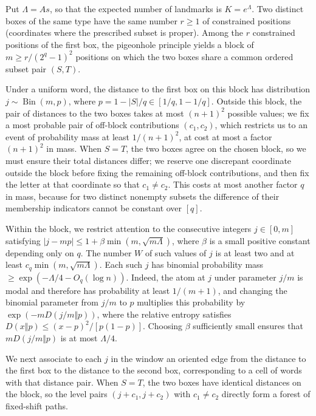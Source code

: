Put $\Lambda=As$, so that the expected number of landmarks is $K=e^{\Lambda}$. Two distinct boxes of the same type have the same number $r\ge1$ of constrained positions (coordinates where the prescribed subset is proper). Among the $r$ constrained positions of the first box, the pigeonhole principle yields a block of $m\ge r/(2^q-1)^2$ positions on which the two boxes share a common ordered subset pair $(S,T)$.

Under a uniform word, the distance to the first box on this block has distribution $j\sim\operatorname{Bin}(m,p)$, where $p=1-|S|/q\in[1/q,1-1/q]$. Outside this block, the pair of distances to the two boxes takes at most $(n+1)^2$ possible values; we fix a most probable pair of off-block contributions $(c_1,c_2)$, which restricts us to an event of probability mass at least $1/(n+1)^2$, at cost at most a factor $(n+1)^2$ in mass. When $S=T$, the two boxes agree on the chosen block, so we must ensure their total distances differ; we reserve one discrepant coordinate outside the block before fixing the remaining off-block contributions, and then fix the letter at that coordinate so that $c_1\ne c_2$. This costs at most another factor $q$ in mass, because for two distinct nonempty subsets the difference of their membership indicators cannot be constant over $[q]$.

Within the block, we restrict attention to the consecutive integers $j\in[0,m]$ satisfying $|j-mp|\le1+\beta\min(m,\sqrt{m\Lambda})$, where $\beta$ is a small positive constant depending only on $q$. The number $W$ of such values of $j$ is at least two and at least $c_q\min(m,\sqrt{m\Lambda})$. Each such $j$ has binomial probability mass $\ge\exp(-\Lambda/4-O_q(\log n))$. Indeed, the atom at $j$ under parameter $j/m$ is modal and therefore has probability at least $1/(m+1)$, and changing the binomial parameter from $j/m$ to $p$ multiplies this probability by $\exp(-mD(j/m\Vert p))$, where the relative entropy satisfies $D(x\Vert p)\le (x-p)^2/[p(1-p)]$. Choosing $\beta$ sufficiently small ensures that $mD(j/m\Vert p)$ is at most $\Lambda/4$.

We next associate to each $j$ in the window an oriented edge from the distance to the first box to the distance to the second box, corresponding to a cell of words with that distance pair. When $S=T$, the two boxes have identical distances on the block, so the level pairs $(j+c_1,j+c_2)$ with $c_1\ne c_2$ directly form a forest of fixed-shift paths.

